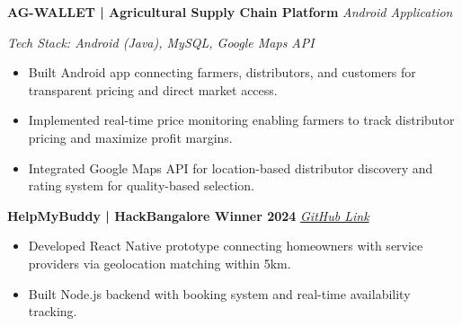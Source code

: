 \documentclass[11pt,a4paper]{article}
\newcommand{\projectheading}[2]{
  \textbf{\color{navyblue}#1} \hfill \textit{\color{lightgray}#2}
  \vspace{-2pt}
}
\begin{document}
\projectheading{AG-WALLET | Agricultural Supply Chain Platform}{Android Application}
\vspace{1pt}
\textit{\small Tech Stack: Android (Java), MySQL, Google Maps API}
\vspace{2pt}
\begin{itemize}
\item Built Android app connecting farmers, distributors, and customers for transparent pricing and direct market access.
\item Implemented real-time price monitoring enabling farmers to track distributor pricing and maximize profit margins.
\item Integrated Google Maps API for location-based distributor discovery and rating system for quality-based selection.
\end{itemize}

\vspace{7pt}

\projectheading{HelpMyBuddy | HackBangalore Winner 2024}{\href{https://github.com/SiliconNinjas/HelpMyBuddy}{GitHub Link}}
\vspace{2pt}
\begin{itemize}
\item Developed React Native prototype connecting homeowners with service providers via geolocation matching within 5km.
\item Built Node.js backend with booking system and real-time availability tracking.
\end{itemize}
\end{document}

